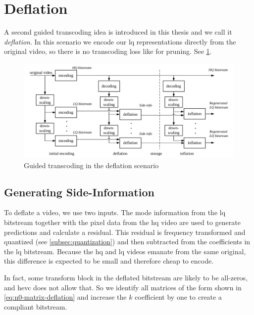 \section{Deflation}
A second guided transcoding idea is introduced in this thesis and we call it \textit{deflation}. In this scenario we encode our \gls{lq} representations directly from the original video, so there is no transcoding loss like for pruning. See \cref{fig:gt-deflation}.

\begin{figure}
    \centering
    \includegraphics[scale=0.8]{pictures/visio/deflation}
    \caption{Guided transcoding in the deflation scenario}
    \label{fig:gt-deflation}
\end{figure}

\subsection{Generating Side-Information}

To deflate a video, we use two inputs. The mode information from the \gls{lq} bitstream together with the pixel data from the \gls{hq} video are used to generate predictions and calculate a residual. This residual is frequency transformed and quantized (see \cref{subsec:quantization}) and then subtracted from the coefficients in the \gls{lq} bitstream. Because the \gls{hq} and \gls{lq} videos emanate from the same original, this difference is expected to be small and therefore cheap to encode.

In fact, some transform block in the deflated bitstream are likely to be all-zeros, and \gls{hevc} does not allow that. So we identify all matrices of the form shown in \cref{eq:n0-matrix-deflation} and increase the $k$ coefficient by one to create a compliant bitstream.


